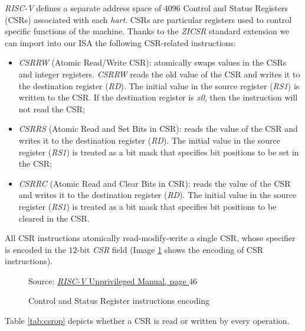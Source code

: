 \textit{RISC-V} defines a separate address space of $4096$ Control and Status Registers
(CSRs) associated with each \textit{hart}. CSRs are particular registers used to
control specific functions of the machine. Thanks to the \textit{ZICSR} standard
extension we can import into our ISA the following CSR-related instructions:
\begin{itemize}
  \item \textit{CSRRW} (Atomic Read/Write CSR): atomically swaps values in the CSRs
    and integer registers. \textit{CSRRW} reads the old value of the CSR and writes
    it to the destination register (\textit{RD}). The initial value in the source
    register (\textit{RS1}) is written to the CSR. If the destination register is
    \textit{x0}, then the instruction will not read the CSR;

  \item \textit{CSRRS} (Atomic Read and Set Bits in CSR): reads the value of the
    CSR and writes it to the destination register (\textit{RD}). The initial value
    in the source register (\textit{RS1}) is treated as a bit mask that
    specifies bit positions to be set in the CSR;

  \item \textit{CSRRC} (Atomic Read and Clear Bits in CSR): reads the value of the
    CSR and writes it to the destination register (\textit{RD}). The initial value
    in the source register (\textit{RS1}) is treated as a bit mask that
    specifies bit positions to be cleared in the CSR.
\end{itemize}
All CSR instructions atomically read-modify-write a single CSR, whose specifier is
encoded in the $12$-bit \textit{CSR} field (Image \ref{fig:csrinstr} shows the encoding
of CSR instructions).

\begin{figure}[htbp]
  \centering
  \def\stackalignment{r} %
  {\scriptsize Source: \href{https://drive.google.com/file/d/1uviu1nH-tScFfgrovvFCrj7Omv8tFtkp/view}{\textit{RISC-V} Unprivileged Manual, page $46$}}
  \caption{Control and Status Register instructions encoding}
  \label{fig:csrinstr}
\end{figure}

Table \ref{tab:csrop} depicts whether a CSR is read or written by every operation.

